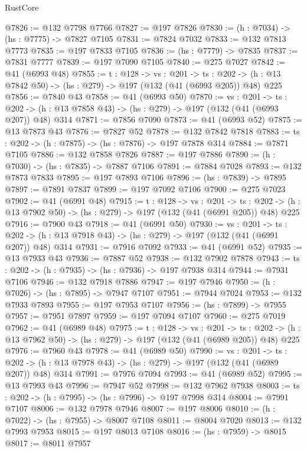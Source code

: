 \begin{lexlean}{RustCore}
\begin{coremodule}
@7826 := @132 @7798 @7766
@7827 := @197 @7826
@7830 := (h : @7034) -> (hs : @7775) -> @7827 @7105
@7831 := @7824 @7032
@7833 := @132 @7813 @7773
@7835 := @197 @7833 @7105
@7836 := (hs : @7779) -> @7835
@7837 := @7831 @7777
@7839 := @197 @7090 @7105
@7840 := @275 @7027
@7842 := @41 (@6993 @48)
@7855 := {t : @128} ->
  {vs : @201} ->
  {ts : @202} -> (h : @13 @7842 @50) -> (hs : @279) -> @197 (@132 (@41 (@6993 @205)) @48) @225
@7856 := @7840 @43
@7858 := @41 (@6993 @50)
@7870 := {vs : @201} ->
  {ts : @202} -> (h : @13 @7858 @43) -> (hs : @279) -> @197 (@132 (@41 (@6993 @207)) @48) @314
@7871 := @7856 @7090
@7873 := @41 (@6993 @52)
@7875 := @13 @7873 @43
@7876 := @7827 @52
@7878 := @132 @7842 @7818
@7883 := {ts : @202} -> (h : @7875) -> (hs : @7876) -> @197 @7878 @314
@7884 := @7871 @7105
@7886 := @132 @7858 @7826
@7887 := @197 @7886
@7890 := (h : @7030) -> (hs : @7835) -> @7887 @7106
@7891 := @7884 @7028
@7893 := @132 @7873 @7833
@7895 := @197 @7893 @7106
@7896 := (hs : @7839) -> @7895
@7897 := @7891 @7837
@7899 := @197 @7092 @7106
@7900 := @275 @7023
@7902 := @41 (@6991 @48)
@7915 := {t : @128} ->
  {vs : @201} ->
  {ts : @202} -> (h : @13 @7902 @50) -> (hs : @279) -> @197 (@132 (@41 (@6991 @205)) @48) @225
@7916 := @7900 @43
@7918 := @41 (@6991 @50)
@7930 := {vs : @201} ->
  {ts : @202} -> (h : @13 @7918 @43) -> (hs : @279) -> @197 (@132 (@41 (@6991 @207)) @48) @314
@7931 := @7916 @7092
@7933 := @41 (@6991 @52)
@7935 := @13 @7933 @43
@7936 := @7887 @52
@7938 := @132 @7902 @7878
@7943 := {ts : @202} -> (h : @7935) -> (hs : @7936) -> @197 @7938 @314
@7944 := @7931 @7106
@7946 := @132 @7918 @7886
@7947 := @197 @7946
@7950 := (h : @7026) -> (hs : @7895) -> @7947 @7107
@7951 := @7944 @7024
@7953 := @132 @7933 @7893
@7955 := @197 @7953 @7107
@7956 := (hs : @7899) -> @7955
@7957 := @7951 @7897
@7959 := @197 @7094 @7107
@7960 := @275 @7019
@7962 := @41 (@6989 @48)
@7975 := {t : @128} ->
  {vs : @201} ->
  {ts : @202} -> (h : @13 @7962 @50) -> (hs : @279) -> @197 (@132 (@41 (@6989 @205)) @48) @225
@7976 := @7960 @43
@7978 := @41 (@6989 @50)
@7990 := {vs : @201} ->
  {ts : @202} -> (h : @13 @7978 @43) -> (hs : @279) -> @197 (@132 (@41 (@6989 @207)) @48) @314
@7991 := @7976 @7094
@7993 := @41 (@6989 @52)
@7995 := @13 @7993 @43
@7996 := @7947 @52
@7998 := @132 @7962 @7938
@8003 := {ts : @202} -> (h : @7995) -> (hs : @7996) -> @197 @7998 @314
@8004 := @7991 @7107
@8006 := @132 @7978 @7946
@8007 := @197 @8006
@8010 := (h : @7022) -> (hs : @7955) -> @8007 @7108
@8011 := @8004 @7020
@8013 := @132 @7993 @7953
@8015 := @197 @8013 @7108
@8016 := (hs : @7959) -> @8015
@8017 := @8011 @7957

\end{coremodule}
\end{lexlean}

